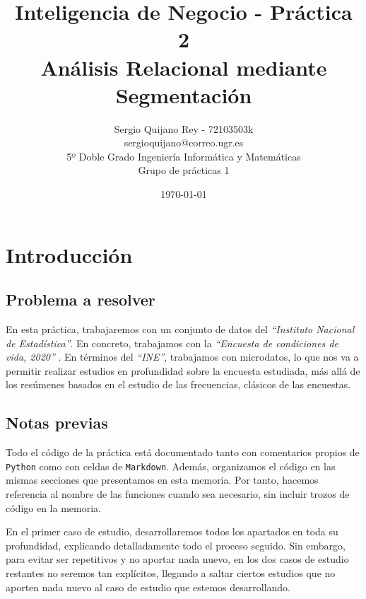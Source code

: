 \documentclass[11pt]{article}
\title{
    {Inteligencia de Negocio - Práctica 2} \\
    {Análisis Relacional mediante Segmentación}
}
\author{
    {Sergio Quijano Rey - 72103503k}\\
    {sergioquijano@correo.ugr.es} \\
    {5º Doble Grado Ingeniería Informática y Matemáticas} \\
    {Grupo de prácticas 1}
}
\date{\today}
\newcommand{\entrecomillado}[1]{\emph{``#1''}}
\begin{document}
\maketitle
\pagebreak

\tableofcontents


\listoffigures


{}

\pagebreak

\section{Introducción}

\subsection{Problema a resolver}

En esta práctica, trabajaremos con un conjunto de datos del \entrecomillado{Instituto Nacional de Estadística}. En concreto, trabajamos con la \entrecomillado{Encuesta de condiciones de vida, 2020} \cite{original_dataset:online}. En términos del \entrecomillado{INE}, trabajamos con microdatos, lo que nos va a permitir realizar estudios en profundidad sobre la encuesta estudiada, más allá de los resúmenes basados en el estudio de las frecuencias, clásicos de las encuestas.

\subsection{Notas previas}

Todo el código de la práctica está documentado tanto con comentarios propios de \lstinline{Python} como con celdas de \lstinline{Markdown}. Además, organizamos el código en las mismas secciones que presentamos en esta memoria. Por tanto, hacemos referencia al nombre de las funciones cuando sea necesario, sin incluir trozos de código en la memoria.

En el primer caso de estudio, desarrollaremos todos los apartados en toda su profundidad, explicando detalladamente todo el proceso seguido. Sin embargo, para evitar ser repetitivos y no aportar nada nuevo, en los dos casos de estudio restantes no seremos tan explícitos, llegando a saltar ciertos estudios que no aporten nada nuevo al caso de estudio que estemos desarrollando.
\end{document}

